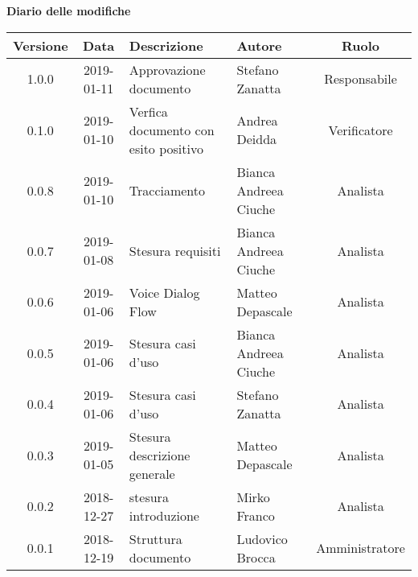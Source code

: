	\begin{center}
		\textbf{Diario delle modifiche}
	\end{center}
	\begin{center}
		\begin{tabularx}{\textwidth}{|c|c|X|X|c|}
			\hline
			\textbf{Versione} & \textbf{Data} & \textbf{Descrizione} & \textbf{Autore} & \textbf{Ruolo} \\
			\hline
			1.0.0 & 2019-01-11 & Approvazione documento& Stefano Zanatta & Responsabile\\
			\hline
			0.1.0 & 2019-01-10 & Verfica documento con esito positivo& Andrea Deidda & Verificatore\\
			\hline
			0.0.8 & 2019-01-10 &Tracciamento& Bianca Andreea Ciuche& Analista\\
			\hline
			0.0.7 & 2019-01-08 &Stesura requisiti & Bianca Andreea Ciuche& Analista\\
			\hline
			0.0.6 & 2019-01-06 & Voice Dialog Flow & Matteo Depascale & Analista\\
			\hline
			0.0.5 & 2019-01-06 & Stesura casi d'uso& Bianca Andreea Ciuche & Analista\\
			\hline
			0.0.4 & 2019-01-06 & Stesura casi d'uso& Stefano Zanatta & Analista\\
			\hline
			0.0.3 & 2019-01-05 & Stesura descrizione generale& Matteo Depascale & Analista\\
			\hline
			0.0.2 & 2018-12-27 & stesura introduzione & Mirko Franco & Analista\\
			\hline
			0.0.1 & 2018-12-19 & Struttura documento & Ludovico Brocca & Amministratore\\
			\hline
		\end{tabularx}
	\end{center}
\newpage